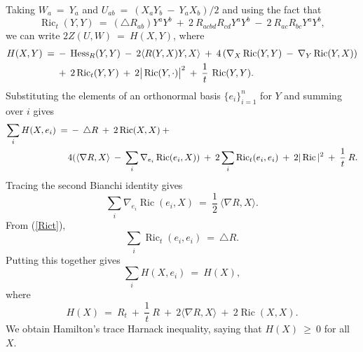 \documentclass[12pt]{amsart}
\newcommand{\Hess}{\operatorname{Hess}}
\newcommand{\Ric}{\operatorname{Ric}}
\numberwithin{equation}{section}
\theoremstyle{plain}
\theoremstyle{definition}
\theoremstyle{remark}
\begin{document}
Taking
$W_a \: = \: Y_a$ and $U_{ab} \: = \: (X_a Y_b \: - \:
Y_a X_b)/2$ and 
using the fact that
\begin{equation} \label{Rict}
\Ric_t(Y, Y) \: = \: (\triangle R_{ab}) Y^a Y^b \: + \:
2 \: R_{acbd} R_{cd} Y^a Y^b \: - \: 2 \: R_{ac} R_{bc} Y^a Y^b, 
\end{equation}
we can write $2Z(U, W) \: = \: H(X, Y)$, where
\begin{align} \label{Hexpression}
H(X, Y) \: = \: & - \: \Hess_R (Y,Y) \: - \: 2 \langle R(Y, X)Y, X \rangle
\: +\: 4 \left( \nabla_X \Ric(Y, Y) \: - \: \nabla_Y \Ric(Y, X) \right) \\
&  + \: 2 \Ric_t(Y, Y) \: + \: 2 \big| \Ric(Y, \cdot) \big|^2
\: + \: \frac{1}{t} \: \Ric(Y, Y). \notag
\end{align}
Substituting the elements of an orthonormal basis $\{e_i\}_{i=1}^n$ for
$Y$ and summing over $i$ gives
\begin{align}
\sum_i H(X, e_i) \: = & \: - \: \triangle R \: + \: 2 \Ric(X, X) \: +  \\
& 4 (\langle \nabla R, X \rangle
 \: - \: \sum_i \nabla_{e_i} \Ric(e_i, X)) \: + \:
2 \sum_i \Ric_t(e_i, e_i) \: + \: 2 |\Ric|^2 \: + \: \frac{1}{t} \: R.
\notag
\end{align}
Tracing the second Bianchi identity gives
\begin{equation}
\sum_i \nabla_{e_i} \Ric(e_i, X) \: = \: 
\frac{1}{2} \: \langle \nabla R, X \rangle.
\end{equation}
From (\ref{Rict}),
\begin{equation}
\sum_i \Ric_t(e_i, e_i) \: = \: \triangle R.
\end{equation}
Putting this together gives
\begin{equation} \label{together}
\sum_i H(X, e_i) \: = \: H(X),
\end{equation}
where 
\begin{equation} \label{Heqn}
H(X) \: = \: R_t \: + \: \frac{1}{t} \: R \: + \:
2 \langle \nabla R, X \rangle \: 
+ \: 2 \Ric(X, X).
\end{equation}
We obtain Hamilton's trace Harnack 
inequality, saying that $H(X) \: \ge \: 0$ for all $X$. 
\end{document}
